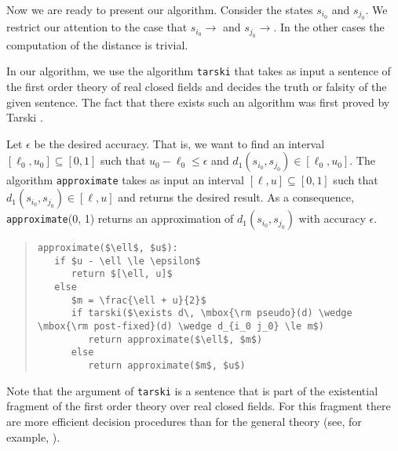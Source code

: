 \documentclass{LMCS}
\begin{document}
Now we are ready to present our algorithm.  Consider the states
$s_{i_0}$ and $s_{j_0}$.  We restrict our attention to the case 
that $s_{i_0} \rightarrow$ and $s_{j_0} \rightarrow$.  In the
other cases the computation of the distance is trivial.

In our algorithm, we use the algorithm {\tt tarski} that takes 
as input a sentence of the first order theory of real closed fields 
and decides the truth or falsity of the given sentence.  The fact 
that there exists such an algorithm was first proved by Tarski \cite{T51}.

Let $\epsilon$ be the desired accuracy.  That is, we want to find an 
interval $[\ell_0, u_0] \subseteq [0, 1]$ such that $u_0 - \ell_0 \le \epsilon$ 
and $d_1(s_{i_0}, s_{j_0}) \in [\ell_0, u_0]$.
The algorithm {\tt approximate} takes as input an interval
$[\ell, u] \subseteq [0, 1]$ such that $d_1(s_{i_0}, s_{j_0}) \in [\ell, u]$
and returns the desired result.  As a consequence, {\tt approximate}(0, 1)
returns an approximation of $d_1(s_{i_0}, s_{j_0})$ with accuracy $\epsilon$.

\begin{quote}
\begin{lstlisting}
approximate($\ell$, $u$):
   if $u - \ell \le \epsilon$
      return $[\ell, u]$
   else
      $m = \frac{\ell + u}{2}$
      if tarski($\exists d\, \mbox{\rm pseudo}(d) \wedge \mbox{\rm post-fixed}(d) \wedge d_{i_0 j_0} \le m$)
         return approximate($\ell$, $m$)
      else
         return approximate($m$, $u$)
\end{lstlisting}
\end{quote}

Note that the argument of {\tt tarski} is a sentence that is part of
the existential fragment of the first order theory over real closed fields.
For this fragment there are more efficient decision procedures than
for the general theory (see, for example, \cite{SPR96:jacm}).  
\end{document}

